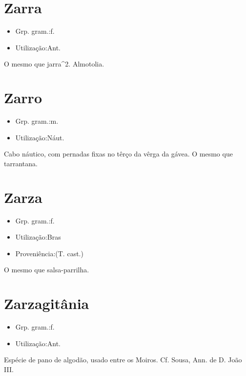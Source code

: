 \section{Zarra}
\begin{itemize}
\item {Grp. gram.:f.}
\end{itemize}
\begin{itemize}
\item {Utilização:Ant.}
\end{itemize}
O mesmo que \textunderscore jarra\textunderscore ^2.
Almotolia.
\section{Zarro}
\begin{itemize}
\item {Grp. gram.:m.}
\end{itemize}
\begin{itemize}
\item {Utilização:Náut.}
\end{itemize}
Cabo náutico, com pernadas fixas no têrço da vêrga da gávea.
O mesmo que \textunderscore tarrantana\textunderscore .
\section{Zarza}
\begin{itemize}
\item {Grp. gram.:f.}
\end{itemize}
\begin{itemize}
\item {Utilização:Bras}
\end{itemize}
\begin{itemize}
\item {Proveniência:(T. cast.)}
\end{itemize}
O mesmo que \textunderscore salsa-parrilha\textunderscore .
\section{Zarzagitânia}
\begin{itemize}
\item {Grp. gram.:f.}
\end{itemize}
\begin{itemize}
\item {Utilização:Ant.}
\end{itemize}
Espécie de pano de algodão, usado entre os Moiros. Cf. Sousa, \textunderscore Ann. de D. João III\textunderscore .
